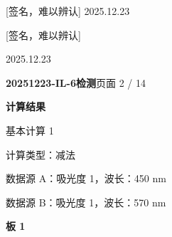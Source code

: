 \documentclass[UTF8,10pt,a4paper,fontset=fandol]{ctexart}
\newcommand{\handwritten}[1]{#1}
\begin{document}

\begin{flushright}
\handwritten{[签名，难以辨认] 2025.12.23}

\handwritten{[签名，难以辨认]}

\handwritten{2025.12.23}
\end{flushright}

\newpage

\noindent\textbf{20251223-IL-6检测}\hfill 页面 2 / 14

\vspace{0.5em}

\noindent\textbf{计算结果}

\noindent\quad 基本计算 1

\noindent\quad 计算类型：减法

\noindent\quad 数据源 A：吸光度 1，波长：450 nm

\noindent\quad 数据源 B：吸光度 1，波长：570 nm

\vspace{0.5em}

\noindent\textbf{板 1}


\end{document}
